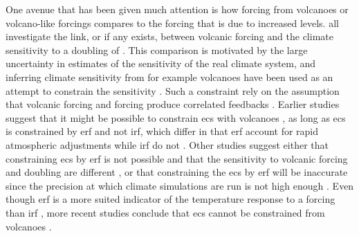 \documentclass[twocol]{ametsocV6.1}
\begin{document}



One avenue that has been given much attention is how forcing from volcanoes or
volcano-like forcings compares to the forcing that is due to increased  levels.
\citet{boer2007,marvel2016,merlis2014,ollila2016,richardson2019,salvi2022,wigley2005}
all investigate the link, or if any exists, between volcanic forcing and the climate
sensitivity to a doubling of . This comparison is motivated by the large
uncertainty in estimates of the sensitivity of the real climate system, and inferring
climate sensitivity from for example volcanoes have been used as an attempt to constrain
the sensitivity \citep{boer2007}. Such a constraint rely on the assumption that volcanic
forcing and  forcing produce correlated feedbacks \citep{pauling2023}. Earlier
studies suggest that it might be possible to constrain \gls{ecs} with volcanoes
\citep{bender2010}, as long as \gls{ecs} is constrained by \gls{erf} and not \gls{irf},
which differ in that \gls{erf} account for rapid atmospheric adjustments while \gls{irf}
do not \citep{richardson2019}. Other studies suggest either that constraining \gls{ecs}
by \gls{erf} is not possible and that the sensitivity to volcanic forcing and 
doubling are different \citep{douglass2006}, or that constraining the \gls{ecs} by
\gls{erf} will be inaccurate since the precision at which climate simulations are run is
not high enough \citep{boer2007,salvi2022}. Even though \gls{erf} is a more suited
indicator of the temperature response to a forcing than \gls{irf}
\citep{marvel2016,richardson2019}, more recent studies conclude that \gls{ecs} cannot be
constrained from volcanoes \citep{pauling2023}.

\end{document}
